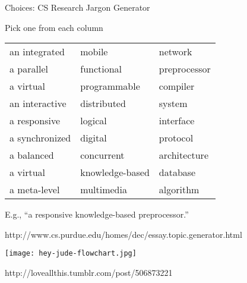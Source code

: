 \documentclass{plt}
\begin{document}
\begin{frame}{Choices: CS Research Jargon Generator}

\begin{center}

Pick one from each column
\medskip

\begin{tabular}{lll}
\cmidrule(lr){1-1}
\cmidrule(lr){2-2}
\cmidrule(lr){3-3}
an integrated    & mobile          & network        \\
a parallel       & functional      & preprocessor   \\
a virtual        & programmable    & compiler       \\
an interactive   & distributed     & system         \\
a responsive     & logical         & interface      \\
a synchronized   & digital         & protocol       \\
a balanced       & concurrent      & architecture   \\
a virtual        & knowledge-based & database       \\
a meta-level     & multimedia      & algorithm      \\
\cmidrule(lr){1-1}
\cmidrule(lr){2-2}
\cmidrule(lr){3-3}
\end{tabular}

\medskip

E.g., ``a responsive knowledge-based preprocessor.''

\tiny
http://www.cs.purdue.edu/homes/dec/essay.topic.generator.html
\end{center}
\end{frame}


\begin{frame}
\centerline{\texttt{[image: hey-jude-flowchart.jpg]}}

\footnotesize http://loveallthis.tumblr.com/post/506873221
\end{frame}
\end{document}
